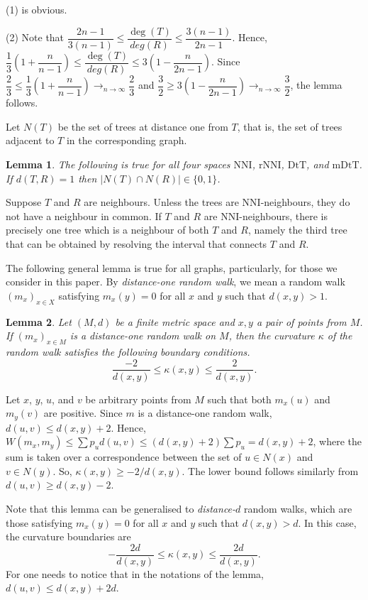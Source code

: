 \documentclass{amsart}
\newtheorem{lemma}{Lemma}
\newcommand{\dts}{\mathrm{DtT}}
\newcommand{\nni}{\mathrm{NNI}}
\newcommand{\rnni}{\mathrm{rNNI}}
\newcommand{\mdts}{\mathrm{mDtT}}
\begin{document}
\proof
(1) is obvious. 

(2) Note that $\dfrac{2n-1}{3(n - 1)} \leq \dfrac{\deg(T)}{deg(R)} \leq \dfrac{3(n - 1)}{2n - 1}$.
Hence, $\dfrac{1}{3}(1+\dfrac{n}{n-1}) \leq \dfrac{\deg(T)}{deg(R)} \leq 3(1 - \dfrac{n}{2n - 1})$. 
Since $\dfrac23 \leq \dfrac{1}{3}(1+\dfrac{n}{n-1}) \to_{n\to\infty}\dfrac23$ and $\dfrac32 \geq 3(1 - \dfrac{n}{2n-1}) \to_{n\to\infty} \dfrac32$, the lemma follows. 
\endproof

Let $N(T)$ be the set of trees at distance one from $T$, that is, the set of
trees adjacent to $T$ in the corresponding graph. 

\begin{lemma}\label{intersecNeighb}
The following is true for all four spaces $\nni$, $\rnni$, $\dts$, and $\mdts$.
If $d(T,R) = 1$ then $|N(T)\cap N(R)|\in\{0,1\}$.
\end{lemma}

\proof
Suppose $T$ and $R$ are neighbours. 
Unless the trees are NNI-neighbours, they do not have a neighbour in common. 
If $T$ and $R$ are NNI-neighbours, there is precisely one tree which is a neighbour of both $T$ and $R$, namely the third tree that can be obtained by resolving the interval that connects $T$ and $R$. 
\endproof

The following general lemma is true for all graphs, particularly, for those we consider in this paper.  
By {\em distance-one random walk}, we mean a random walk $(m_x)_{x \in X}$ satisfying $m_x(y) = 0$ for all $x$ and $y$ such that $d(x,y) > 1$. 

\begin{lemma}\label{curvBoundGeneral}
Let $(M,d)$ be a finite metric space and $x,y$ a pair of points from $M$. If
$(m_x)_{x \in M}$ is a distance-one random walk on $M$, then the curvature 
$\kappa$ of the random walk satisfies the following boundary conditions. 
\[
\dfrac{-2}{d(x,y)} \leq \kappa(x,y) \leq \dfrac{2}{d(x,y)}.
\]
\end{lemma}

\proof
Let $x$, $y$, $u$, and $v$ be arbitrary points from $M$ such that both $m_x(u)$
and $m_y(v)$ are positive. Since $m$ is a distance-one random walk, 
$d(u,v) \leq d(x,y) + 2$. Hence, 
$W(m_x,m_y) \leq \sum p_u d(u,v) \leq (d(x,y)+2)\sum p_u = d(x,y) + 2$, 
where the sum is taken over a correspondence between the set of $u \in N(x)$ and 
$v \in N(y)$. So, $\kappa(x,y) \geq - 2/d(x,y)$. The lower bound follows 
similarly from $d(u,v) \geq d(x,y) - 2$.
\endproof

Note that this lemma can be generalised to {\em distance-$d$} random walks, 
which are those satisfying $m_x(y) = 0$ for all $x$ and $y$ such that 
$d(x,y) > d$. In this case, the curvature boundaries are 
\[
-\dfrac{2d}{d(x,y)} \leq \kappa(x,y) \leq \dfrac{2d}{d(x,y)}.
\]
For one needs to notice that in the notations of the lemma, 
$d(u,v) \leq d(x,y) + 2d$. 
\end{document}
